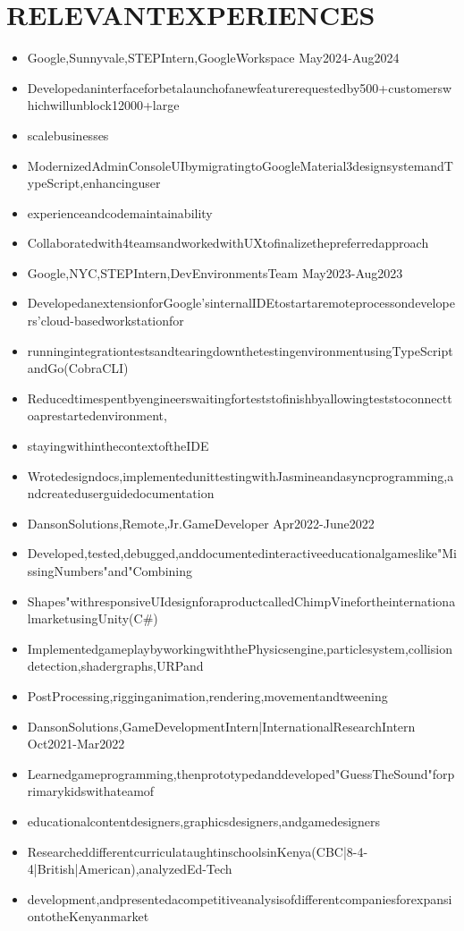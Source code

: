 \documentclass[letterpaper,10pt]{article}
\begin{document}
\section{RELEVANTEXPERIENCES}
\begin{itemize}
  \item Google,Sunnyvale,STEPIntern,GoogleWorkspace May2024-Aug2024
  \item Developedaninterfaceforbetalaunchofanewfeaturerequestedby500+customerswhichwillunblock12000+large
  \item scalebusinesses
  \item ModernizedAdminConsoleUIbymigratingtoGoogleMaterial3designsystemandTypeScript,enhancinguser
  \item experienceandcodemaintainability
  \item Collaboratedwith4teamsandworkedwithUXtofinalizethepreferredapproach
  \item Google,NYC,STEPIntern,DevEnvironmentsTeam May2023-Aug2023
  \item DevelopedanextensionforGoogle'sinternalIDEtostartaremoteprocessondevelopers'cloud-basedworkstationfor
  \item runningintegrationtestsandtearingdownthetestingenvironmentusingTypeScriptandGo(CobraCLI)
  \item Reducedtimespentbyengineerswaitingforteststofinishbyallowingteststoconnecttoaprestartedenvironment,
  \item stayingwithinthecontextoftheIDE
  \item Wrotedesigndocs,implementedunittestingwithJasmineandasyncprogramming,andcreateduserguidedocumentation
  \item DansonSolutions,Remote,Jr.GameDeveloper Apr2022-June2022
  \item Developed,tested,debugged,anddocumentedinteractiveeducationalgameslike"MissingNumbers"and"Combining
  \item Shapes"withresponsiveUIdesignforaproductcalledChimpVinefortheinternationalmarketusingUnity(C\#)
  \item ImplementedgameplaybyworkingwiththePhysicsengine,particlesystem,collisiondetection,shadergraphs,URPand
  \item PostProcessing,rigginganimation,rendering,movementandtweening
  \item DansonSolutions,GameDevelopmentIntern|InternationalResearchIntern Oct2021-Mar2022
  \item Learnedgameprogramming,thenprototypedanddeveloped"GuessTheSound"forprimarykidswithateamof
  \item educationalcontentdesigners,graphicsdesigners,andgamedesigners
  \item ResearcheddifferentcurriculataughtinschoolsinKenya(CBC|8-4-4|British|American),analyzedEd-Tech
  \item development,andpresentedacompetitiveanalysisofdifferentcompaniesforexpansiontotheKenyanmarket
\end{itemize}
\end{document}

